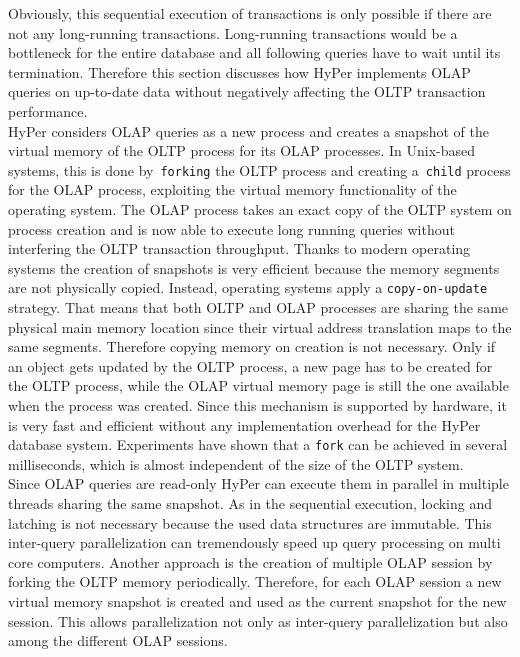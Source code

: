 Obviously, this sequential execution of transactions is only possible if there are not any long-running transactions. Long-running transactions would be a bottleneck for the entire database and all following queries have to wait until its termination. Therefore this section discusses how HyPer implements OLAP queries on up-to-date data without negatively affecting the OLTP transaction performance. 
\\
HyPer considers OLAP queries as a new process and creates a snapshot of the virtual memory of the OLTP process for its OLAP processes. In Unix-based systems, this is done by~\texttt{forking} the OLTP process and creating a~\texttt{child} process for the OLAP process, exploiting the virtual memory functionality of the operating system. The OLAP process takes an exact copy of the OLTP system on process creation and is now able to execute long running queries without interfering the OLTP transaction throughput. Thanks to modern operating systems the creation of snapshots is very efficient because the memory segments are not physically copied. Instead, operating systems apply a \texttt{copy-on-update} strategy. That means that both OLTP and OLAP processes are sharing the same physical main memory location since their virtual address translation maps to the same segments. Therefore copying memory on creation is not necessary. Only if an object gets updated by the OLTP process, a new page has to be created for the OLTP process, while the OLAP virtual memory page is still the one available when the process was created. Since this mechanism is supported by hardware, it is very fast and efficient without any implementation overhead for the HyPer database system. Experiments have shown that a \texttt{fork} can be achieved in several milliseconds, which is almost independent of the size of the OLTP system.
\\
Since OLAP queries are read-only HyPer can execute them in parallel in multiple threads sharing the same snapshot. As in the sequential execution, locking and latching is not necessary because the used data structures are immutable. This inter-query parallelization can tremendously speed up query processing on multi core computers. Another approach is the creation of multiple OLAP session by forking the OLTP memory periodically. Therefore, for each OLAP session a new virtual memory snapshot is created and used as the current snapshot for the new session. This allows parallelization not only as inter-query parallelization but also among the different OLAP sessions.
\\ 
